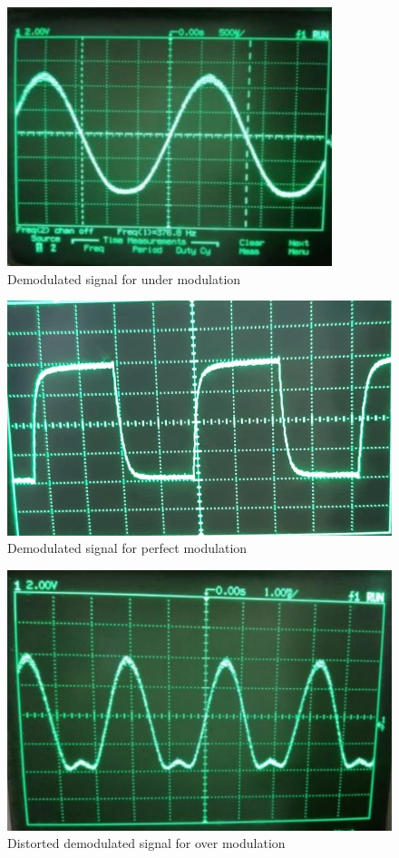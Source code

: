 \documentclass{lab_sheet}
\begin{document}
\begin{figure}[H]
    \centering
    \includegraphics[scale=1.2]{Figures/demod.png}
    \caption{Demodulated signal for under modulation}
    \label{fig:demod}
\end{figure}

\begin{figure}[H]
    \centering
    \includegraphics[scale=0.4]{Figures/perf_mod.jpg}
    \caption{Demodulated signal for perfect modulation}
    \label{fig:perf}
\end{figure}

    \begin{figure}[H]
        \centering
        \includegraphics[scale=0.85]{Figures/distorted.png}
        \caption{Distorted demodulated signal for over modulation}
        \label{fig:dist}
    \end{figure}
\end{document}

